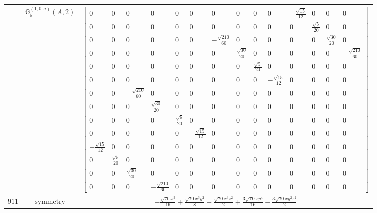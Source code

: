 \documentclass[fleqn,8pt,landscape]{jsarticle}
\begin{document}
\begin{longtable}{ccc}
$  $ & $ \mathbb{G}_{5}^{(1,0;a)}(A,2) $ & $ \begin{bmatrix} 0 & 0 & 0 & 0 & 0 & 0 & 0 & 0 & 0 & 0 & - \frac{\sqrt{15}}{12} & 0 & 0 & 0 \\ 0 & 0 & 0 & 0 & 0 & 0 & 0 & 0 & 0 & 0 & 0 & \frac{\sqrt{5}}{20} & 0 & 0 \\ 0 & 0 & 0 & 0 & 0 & 0 & - \frac{\sqrt{210}}{60} & 0 & 0 & 0 & 0 & 0 & \frac{\sqrt{30}}{20} & 0 \\ 0 & 0 & 0 & 0 & 0 & 0 & 0 & \frac{\sqrt{30}}{20} & 0 & 0 & 0 & 0 & 0 & - \frac{\sqrt{210}}{60} \\ 0 & 0 & 0 & 0 & 0 & 0 & 0 & 0 & \frac{\sqrt{5}}{20} & 0 & 0 & 0 & 0 & 0 \\ 0 & 0 & 0 & 0 & 0 & 0 & 0 & 0 & 0 & - \frac{\sqrt{15}}{12} & 0 & 0 & 0 & 0 \\ 0 & 0 & - \frac{\sqrt{210}}{60} & 0 & 0 & 0 & 0 & 0 & 0 & 0 & 0 & 0 & 0 & 0 \\ 0 & 0 & 0 & \frac{\sqrt{30}}{20} & 0 & 0 & 0 & 0 & 0 & 0 & 0 & 0 & 0 & 0 \\ 0 & 0 & 0 & 0 & \frac{\sqrt{5}}{20} & 0 & 0 & 0 & 0 & 0 & 0 & 0 & 0 & 0 \\ 0 & 0 & 0 & 0 & 0 & - \frac{\sqrt{15}}{12} & 0 & 0 & 0 & 0 & 0 & 0 & 0 & 0 \\ - \frac{\sqrt{15}}{12} & 0 & 0 & 0 & 0 & 0 & 0 & 0 & 0 & 0 & 0 & 0 & 0 & 0 \\ 0 & \frac{\sqrt{5}}{20} & 0 & 0 & 0 & 0 & 0 & 0 & 0 & 0 & 0 & 0 & 0 & 0 \\ 0 & 0 & \frac{\sqrt{30}}{20} & 0 & 0 & 0 & 0 & 0 & 0 & 0 & 0 & 0 & 0 & 0 \\ 0 & 0 & 0 & - \frac{\sqrt{210}}{60} & 0 & 0 & 0 & 0 & 0 & 0 & 0 & 0 & 0 & 0 \end{bmatrix} $ \\ \hline
$ 911 $ & $ \text{symmetry} $ & $ - \frac{\sqrt{70} x^{5}}{16} + \frac{\sqrt{70} x^{3} y^{2}}{8} + \frac{\sqrt{70} x^{3} z^{2}}{2} + \frac{3 \sqrt{70} x y^{4}}{16} - \frac{3 \sqrt{70} x y^{2} z^{2}}{2} $ \\

\end{longtable}
\end{document}
